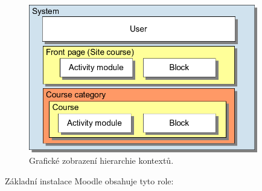 \documentclass[
print,
  11pt,
  table,   
  nolof,    
  nolot,
  oneside,
  draft
]{fithesis3}
\begin{document}
		\begin{figure}
		  \begin{center}
		    \includegraphics[width=100mm]{images/moodle-context.png}
		   \end{center}
		  \caption{Grafické zobrazení hierarchie kontextů.   \cite{moodle-context}}
		  \label{fig:moodlecontext}
		\end{figure}
Základní instalace Moodle obsahuje tyto role:
\end{document}
